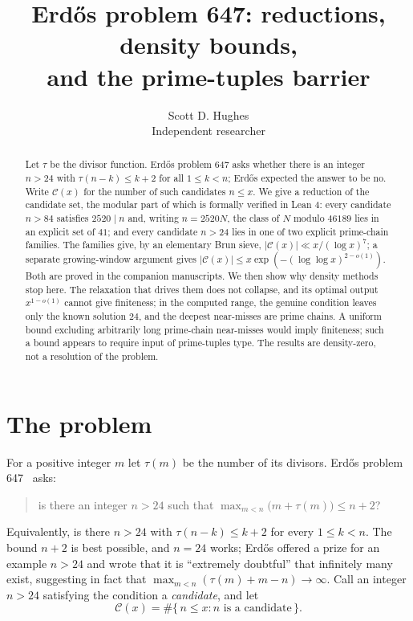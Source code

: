 \documentclass[11pt]{article}
\title{Erd\H{o}s problem 647: reductions, density bounds,\\ and the prime-tuples barrier}
\author{Scott D. Hughes\\ \normalsize Independent researcher}
\date{}
\theoremstyle{remark}
\newcommand{\C}{\mathcal{C}}
\newcommand{\tu}{\tau}
\begin{document}
\maketitle

\begin{abstract}
Let $\tu$ be the divisor function. Erd\H{o}s problem 647 asks whether there is an
integer $n>24$ with $\tu(n-k)\le k+2$ for all $1\le k<n$; Erd\H{o}s expected the
answer to be no. Write $\C(x)$ for the number of such candidates $n\le x$. We give
a reduction of the candidate set, the modular part of which is formally verified in
Lean 4: every candidate $n>84$ satisfies $2520\mid n$ and, writing $n=2520N$, the
class of $N$ modulo $46189$ lies in an explicit set of $41$; and every candidate
$n>24$ lies in one of two explicit prime-chain families. The families give, by an
elementary Brun sieve, $|\C(x)|\ll x/(\log x)^{7}$; a separate growing-window
argument gives $|\C(x)|\le x\exp(-(\log\log x)^{2-o(1)})$. Both are proved in the
companion manuscripts. We then show why density methods stop here. The relaxation
that drives them does not collapse, and its optimal output $x^{1-o(1)}$ cannot give
finiteness; in the computed range, the genuine condition leaves only the known
solution $24$, and the deepest near-misses are prime chains. A uniform bound
excluding arbitrarily long prime-chain near-misses would imply finiteness; such a
bound appears to require input of prime-tuples type. The results are density-zero,
not a resolution of the problem.
\end{abstract}

\section{The problem}

For a positive integer $m$ let $\tu(m)$ be the number of its divisors. Erd\H{o}s
problem 647~\cite{ErdosProblems647Forum} asks:
\begin{quote}
is there an integer $n>24$ such that $\displaystyle\max_{m<n}\bigl(m+\tu(m)\bigr)\le n+2$?
\end{quote}
Equivalently, is there $n>24$ with $\tu(n-k)\le k+2$ for every $1\le k<n$. The bound
$n+2$ is best possible, and $n=24$ works; Erd\H{o}s offered a prize for an example
$n>24$ and wrote that it is ``extremely doubtful'' that infinitely many exist,
suggesting in fact that $\max_{m<n}(\tu(m)+m-n)\to\infty$. Call an integer $n>24$
satisfying the condition a \emph{candidate}, and let
\[
  \C(x)=\#\{\,n\le x: n\text{ is a candidate}\,\}.
\]
\end{document}
